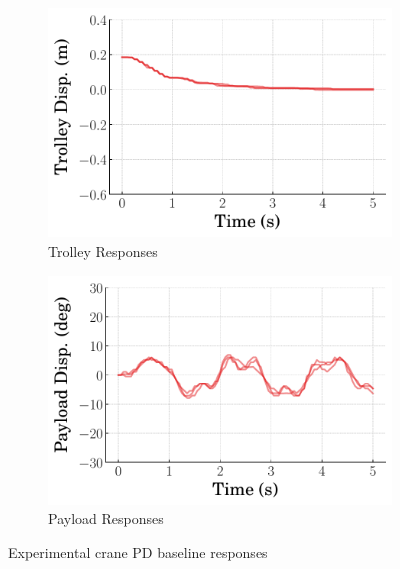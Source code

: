 \begin{figure}[tb]
    \centering
    \begin{subfigure}[b]{0.49\textwidth}
        \centering
        \includegraphics[width=\textwidth]{figures/figures_RL_model_based_control/time_responses_crane_experiments/PD_baseline_trolley_experiment.pdf}
        \caption{Trolley Responses}
        \label{subfig_chap2:dpcrane_experiment_PD_baseline_trolley}
    \end{subfigure}
    \hfill
    \begin{subfigure}[b]{0.49\textwidth}
	    \centering
	    \includegraphics[width=\textwidth]{figures/figures_RL_model_based_control/time_responses_crane_experiments/PD_baseline_payload_experiment.pdf}
	    \caption{Payload Responses}
	    \label{subfig_chap2:dpcrane_experiment_PD_baseline_payload}
    \end{subfigure}
    \caption{Experimental crane PD baseline responses}
    \label{fig_chap2:dpcrane_experiment_PD_baseline}
\end{figure}

